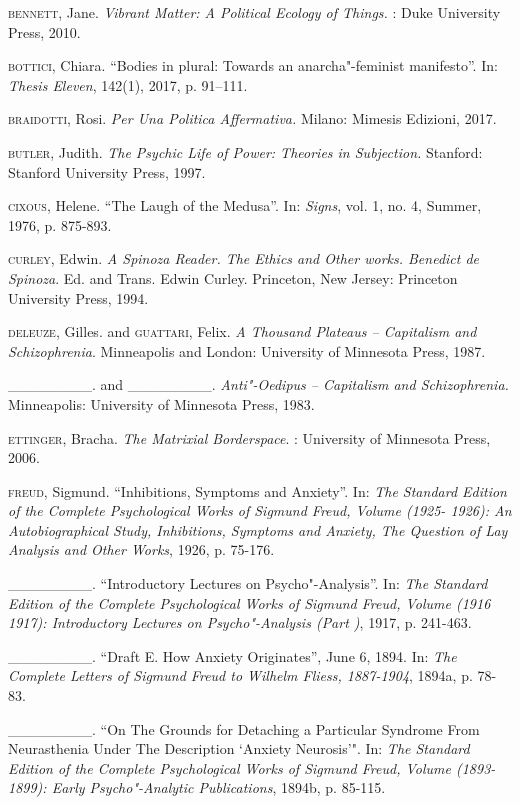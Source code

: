 \begin{Parskip}
\textsc{bennett}, Jane. \emph{Vibrant
Matter: A Political Ecology of Things.} : Duke University Press, 2010.

\textsc{bottici}, Chiara. ``Bodies in plural: Towards an anarcha"-feminist
manifesto''. In: \emph{Thesis Eleven}, 142(1), 2017, p. 91--111.

\textsc{braidotti}, Rosi. \emph{Per Una Politica Affermativa.} Milano: Mimesis
Edizioni, 2017.

\textsc{butler}, Judith. \emph{The Psychic Life of Power: Theories in
Subjection.} Stanford: Stanford University Press, 1997.

\textsc{cixous}, Helene. ``The Laugh of the Medusa''. In: \emph{Signs}, vol. 1, no.
4, Summer, 1976, p. 875-893.

\textsc{curley}, Edwin. \emph{A Spinoza Reader. The Ethics and Other works.
Benedict de Spinoza}. Ed. and Trans. Edwin Curley. Princeton, New Jersey:
Princeton University Press, 1994.

\textsc{deleuze}, Gilles. and \textsc{guattari}, Felix. \emph{A Thousand Plateaus --
Capitalism and Schizophrenia}. Minneapolis and London: University of
Minnesota Press, 1987.

\_\_\_\_\_\_\_\_. and \_\_\_\_\_\_\_\_. \emph{Anti"-Oedipus -- Capitalism and
Schizophrenia.} Minneapolis: University of Minnesota Press, 1983.

\textsc{ettinger}, Bracha. \emph{The Matrixial Borderspace}. : University of
Minnesota Press, 2006.

\textsc{freud}, Sigmund. ``Inhibitions, Symptoms and Anxiety''. In: \emph{The Standard
Edition of the Complete Psychological Works of Sigmund Freud, Volume 
(1925- 1926): An Autobiographical Study, Inhibitions, Symptoms and
Anxiety, The Question of Lay Analysis and Other Works}, 1926, p. 75-176.

\_\_\_\_\_\_\_\_. ``Introductory Lectures on Psycho"-Analysis''. In: \emph{The
Standard Edition of the Complete Psychological Works of Sigmund Freud,
Volume  (1916 1917): Introductory Lectures on Psycho"-Analysis (Part
)}, 1917, p. 241-463.

\_\_\_\_\_\_\_\_.  ``Draft E. How Anxiety Originates'', June 6, 1894. In:
\emph{The Complete Letters of Sigmund Freud to Wilhelm Fliess,
1887-1904}, 1894a, p. 78-83.

\_\_\_\_\_\_\_\_.  ``On The Grounds for Detaching a Particular Syndrome
From Neurasthenia Under The Description `Anxiety Neurosis'". In: \emph{The
Standard Edition of the Complete Psychological Works of Sigmund Freud,
Volume  (1893-1899): Early Psycho"-Analytic Publications}, 1894b, p. 85-115.


\end{Parskip}
